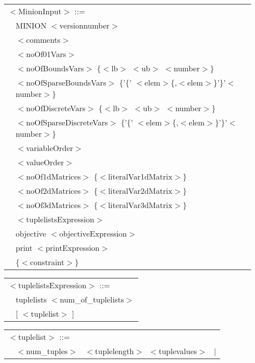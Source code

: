 \documentclass{article}
\begin{document}
\begin{small}
{\setlength{\tabcolsep}{0mm}
\begin{tabular}{ll}
\multicolumn{2}{l}{$<$MinionInput$>$ ::=} \\
\hspace*{2mm} &MINION $<$versionnumber$>$ \\
              &$<$comments$>$\\
              &$<$noOf01Vars$>$\\
              &$<$noOfBoundsVars$>$ \{$<$lb$>$ $<$ub$>$ $<$number$>$\}\\
              &$<$noOfSparseBoundsVars$>$ \{'\{' $<$elem$>$\{,$<$elem$>$\}'\}'$<$number$>$\}\\
              &$<$noOfDiscreteVars$>$ \{$<$lb$>$ $<$ub$>$ $<$number$>$\}\\
              &$<$noOfSparseDiscreteVars$>$ \{'\{' $<$elem$>$\{,$<$elem$>$\}'\}'$<$number$>$\}\\
              &$<$variableOrder$>$\\
              &$<$valueOrder$>$\\
              &$<$noOf1dMatrices$>$ \{$<$literalVar1dMatrix$>$\}\\
              &$<$noOf2dMatrices$>$ \{$<$literalVar2dMatrix$>$\}\\
              &$<$noOf3dMatrices$>$ \{$<$literalVar3dMatrix$>$\}\\
              & $<$tuplelistsExpression$>$ \\
              &objective $<$objectiveExpression$>$\\
              &print $<$printExpression$>$\\
              &\{$<$constraint$>$\}
\end{tabular}
\vspace*{1mm}

\noindent
\setlength{\tabcolsep}{0mm}
\begin{tabular}{ll}
\multicolumn{2}{l}{$<$tuplelistsExpression$>$ ::=}\\
\hspace*{2mm} &   tuplelists $<$num\_of\_tuplelists$>$   \\
\hspace*{2mm} &   [ $<$tuplelist$>$ ] \\
\end{tabular}
\vspace*{1mm}

\noindent
\setlength{\tabcolsep}{0mm}
\begin{tabular}{ll}
\multicolumn{2}{l}{$<$tuplelist$>$ ::=}\\
\hspace*{2mm} &   $<$num\_tuples$>$ \ $<$tuplelength$>$\  $<$tuplevalues$> $ \  $|$ \\
\end{tabular}
\vspace*{1mm}


}
\end{small}
\end{document}
